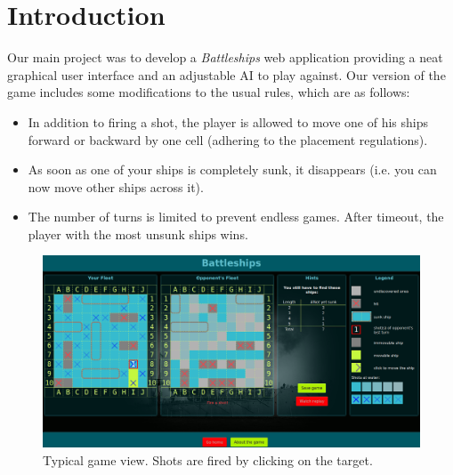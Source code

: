 \documentclass[a4paper]{easychair}
\begin{document}
\section{Introduction}
\label{sect:intro}
Our main project was to develop a \emph{Battleships} web application providing a neat graphical user interface and an adjustable AI to play against. 
Our version of the game includes some modifications to the usual rules, which are as follows:

\begin{itemize}
 \item 
 In addition to firing a shot, the player is allowed to move one of his ships forward or backward by one cell (adhering to the placement regulations).
 \item
 As soon as one of your ships is completely sunk, it disappears (i.e. you can now move other ships across it).
 \item
 The number of turns is limited to prevent endless games. After timeout, the player with the most unsunk ships wins.
\end{itemize}

\begin{figure}
 \centering
  \includegraphics[width=\textwidth]{play.png}
 \caption{Typical game view. Shots are fired by clicking on the target.}
\end{figure}
\end{document}
